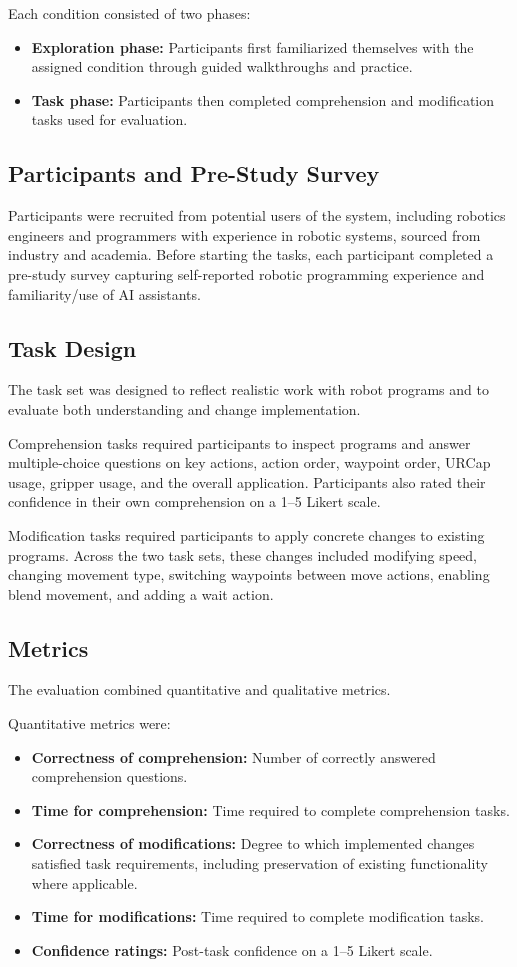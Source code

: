 Each condition consisted of two phases:
\begin{itemize}
    \item \textbf{Exploration phase:} Participants first familiarized themselves with the assigned condition through guided walkthroughs and practice.
    \item \textbf{Task phase:} Participants then completed comprehension and modification tasks used for evaluation.
\end{itemize}

\subsection{Participants and Pre-Study Survey}
Participants were recruited from potential users of the system, including robotics engineers and programmers with experience in robotic systems, sourced from industry and academia. Before starting the tasks, each participant completed a pre-study survey capturing self-reported robotic programming experience and familiarity/use of AI assistants.

\subsection{Task Design}
The task set was designed to reflect realistic work with robot programs and to evaluate both understanding and change implementation.

Comprehension tasks required participants to inspect programs and answer multiple-choice questions on key actions, action order, waypoint order, URCap usage, gripper usage, and the overall application. Participants also rated their confidence in their own comprehension on a 1--5 Likert scale.

Modification tasks required participants to apply concrete changes to existing programs. Across the two task sets, these changes included modifying speed, changing movement type, switching waypoints between move actions, enabling blend movement, and adding a wait action.

\subsection{Metrics}
The evaluation combined quantitative and qualitative metrics.

Quantitative metrics were:
\begin{itemize}
    \item \textbf{Correctness of comprehension:} Number of correctly answered comprehension questions.
    \item \textbf{Time for comprehension:} Time required to complete comprehension tasks.
    \item \textbf{Correctness of modifications:} Degree to which implemented changes satisfied task requirements, including preservation of existing functionality where applicable.
    \item \textbf{Time for modifications:} Time required to complete modification tasks.
    \item \textbf{Confidence ratings:} Post-task confidence on a 1--5 Likert scale.
\end{itemize}

